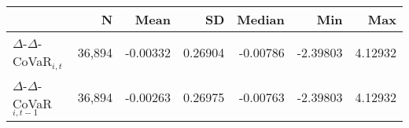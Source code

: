 \begin{tabular}{lrrrrrr}
  \hline
 & N & Mean & SD & Median & Min & Max \\ 
  \hline
$\Delta$-$\Delta$-CoVaR$_{i,t}$ & 36,894 & -0.00332 & 0.26904 & -0.00786 & -2.39803 & 4.12932 \\ 
  $\Delta$-$\Delta$-CoVaR$_{i,t-1}$ & 36,894 & -0.00263 & 0.26975 & -0.00763 & -2.39803 & 4.12932 \\ 
   \hline
\end{tabular}
